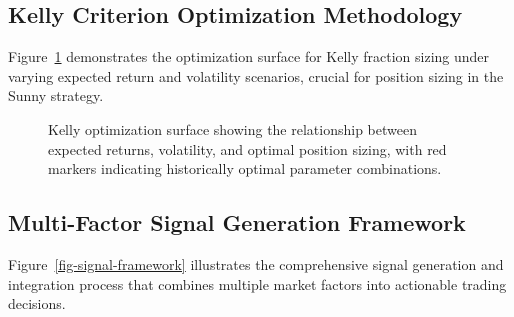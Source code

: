 \documentclass[
  american,
  11pt,
  11pt,
  letterpaper,
  onecolumn]{article}
\begin{document}
\subsection{Kelly Criterion Optimization
Methodology}\label{kelly-criterion-optimization-methodology}

Figure~\ref{fig-kelly-optimization} demonstrates the optimization
surface for Kelly fraction sizing under varying expected return and
volatility scenarios, crucial for position sizing in the Sunny strategy.

\begin{figure}[H]


\caption{\label{fig-kelly-optimization}Kelly optimization surface
showing the relationship between expected returns, volatility, and
optimal position sizing, with red markers indicating historically
optimal parameter combinations.}

\end{figure}%

\newpage

\subsection{Multi-Factor Signal Generation
Framework}\label{multi-factor-signal-generation-framework}

Figure~\ref{fig-signal-framework} illustrates the comprehensive signal
generation and integration process that combines multiple market factors
into actionable trading decisions.
\end{document}
